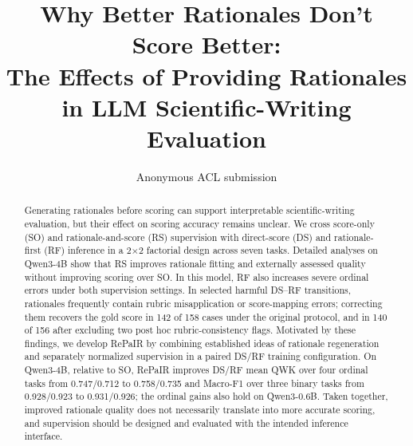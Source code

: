 \documentclass[11pt]{article}
\title{Why Better Rationales Don’t Score Better: \\The Effects of Providing Rationales in LLM Scientific-Writing Evaluation}
\author{Anonymous ACL submission}
\begin{document}
\maketitle  %


\begin{abstract}
Generating rationales before scoring can support interpretable
scientific-writing evaluation, but their effect on scoring accuracy
remains unclear.
We cross score-only (SO) and rationale-and-score (RS) supervision
with direct-score (DS) and rationale-first (RF) inference
in a 2$\times$2 factorial design across seven tasks.
Detailed analyses on Qwen3-4B show that RS improves rationale fitting
and externally assessed quality without improving scoring over SO.
In this model, RF also increases severe ordinal errors
under both supervision settings.
In selected harmful DS--RF transitions, rationales frequently contain
rubric misapplication or score-mapping errors;
correcting them recovers the gold score in 142 of 158 cases under the
original protocol, and in 140 of 156 after excluding two post hoc
rubric-consistency flags.
Motivated by these findings, we develop RePaIR by combining established
ideas of rationale regeneration and separately normalized supervision
in a paired DS/RF training configuration.
On Qwen3-4B, relative to SO, RePaIR improves DS/RF mean QWK
over four ordinal tasks from 0.747/0.712 to 0.758/0.735
and Macro-F1 over three binary tasks from 0.928/0.923
to 0.931/0.926; the ordinal gains also hold on Qwen3-0.6B.
Taken together, improved rationale quality does not necessarily
translate into more accurate scoring, and supervision should be
designed and evaluated with the intended inference interface.
\end{abstract}
\end{document}
